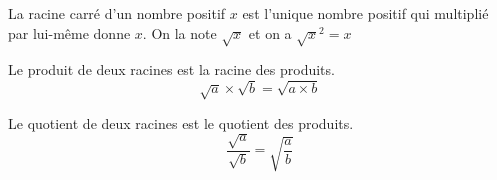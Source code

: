 {   La racine carré d'un nombre positif $x$ est l'unique nombre positif qui multiplié par lui-même donne $x$. On la note $\sqrt{x}$ et on a $\sqrt{x}^2=x$
}

{
    Le produit de deux racines est la racine des produits. $$\sqrt{a}\times\sqrt{b}=\sqrt{a\times b}$$
}

{
    Le quotient de deux racines est le quotient des produits. $$\dfrac{\sqrt{a}}{\sqrt{b}}=\sqrt{\dfrac{a}{b}}$$
}